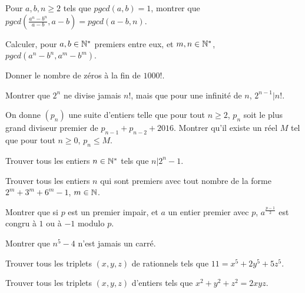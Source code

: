 		\begin{exo}
				Pour $a,b,n \geq 2$ tels que $pgcd(a,b)=1$, montrer que $pgcd\left(\frac{a^n-b^n}{a-b},a-b\right)=pgcd(a-b,n)$.
		\end{exo}

		\begin{exo}
				Calculer, pour $a,b \in \mathbb{N}^*$ premiers entre eux, et $m,n \in \mathbb{N}^*$, $pgcd(a^n-b^n,a^m-b^m)$.
		\end{exo}

		\begin{exo}
				Donner le nombre de zéros à la fin de $1000!$. 
		\end{exo}

		\begin{exo}
				Montrer que $2^n$ ne divise jamais $n!$, mais que pour une infinité de $n$, $2^{n-1}|n!$.
		\end{exo}

		\begin{exo}
				On donne $\left(p_n\right)$ une suite d'entiers telle que pour tout $n \geq 2$, $p_n$ soit le plus grand diviseur premier de $p_{n-1}+p_{n-2}+2016$. Montrer qu'il existe un réel $M$ tel que pour tout $n \geq 0$, $p_n \leq M$. 
		\end{exo}

		\begin{exo}
				Trouver tous les entiers $n \in \mathbb{N}^*$ tels que $n|2^n-1$. 
		\end{exo}

		\begin{exo}
				Trouver tous les entiers $n$ qui sont premiers avec tout nombre de la forme $2^m+3^m+6^m-1$, $m \in \mathbb{N}$.  
		\end{exo}

		\begin{exo}
				Montrer que si $p$ est un premier impair, et $a$ un entier premier avec $p$, $a^{\frac{p-1}{2}}$ est congru à $1$ ou à $-1$ modulo $p$.  
		\end{exo}

		\begin{exo}
				Montrer que $n^5-4$ n'est jamais un carré. 
		\end{exo}

		\begin{exo}
				Trouver tous les triplets $(x,y,z)$ de rationnels tels que $11=x^5+2y^5+5z^5$.
		\end{exo}

		\begin{exo}
				Trouver tous les triplets $(x,y,z)$ d'entiers tels que $x^2+y^2+z^2=2xyz$.
		\end{exo}

